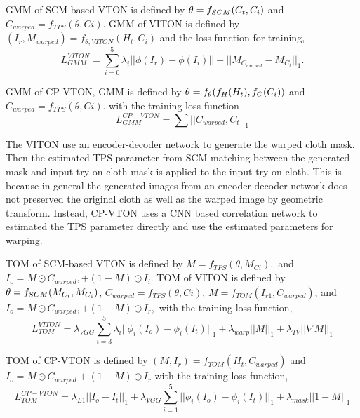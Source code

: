 GMM of SCM-based VTON is defined by  
$
   \bold{\theta} = f_{SCM} (C_t, C_i)
$
and
$
   C_{warped} = f_{TPS}(\theta, Ci)
$.    
GMM of VITON is defined by 
$
   (I_{r}, M_{warped}) = f_{\theta, VITON} (H_t, C_i) 
$
and the loss function for training, 
\begin{equation}
   L_{GMM}^{VITON} =   \sum_{i=0}^{5} \lambda_i || \phi (I_r) - \phi (I_i)||  + 
   ||M_{C_{warped}} -  M_{C_t}||_1 .
\end{equation}

GMM of CP-VTON, GMM is defined by 
$  
   \bold{\theta} = f_{\theta} ( f_H (H_t), f_C(C_i) )
$
and
$
   C_{warped} = f_{TPS}(\theta, Ci).
$    
with the training loss function
\begin{equation}
   L_{GMM}^{CP-VTON} =  \sum ||C_{warped}, C_t||_1
\end{equation}

The VITON use an encoder-decoder network to generate the warped cloth mask. Then the estimated TPS parameter from SCM matching between the generated mask and input try-on cloth mask is applied to the input try-on cloth. This is because in general the generated images from an encoder-decoder network does not preserved the original cloth as well as the warped image by geometric transform. Instead, CP-VTON uses a CNN based correlation network to estimated the TPS parameter directly and use the estimated parameters for warping.   


TOM  of SCM-based VTON  is defined by 
$
   M = f_{TPS}(\theta, M_{Ci}),
$    
and 
$
   I_o = M \odot C_{warped}, + (1-M) \odot I_i 
$.
TOM of VITON is defined by 
$
   \bold{\theta} = f_{SCM} (M_{C_t}, M_{C_i})
$,
$
   C_{warped} = f_{TPS}(\theta, Ci)
$,    
$
 M = f_{TOM} ( I_{r1}, C_{warped} ) 
$, 
and 
$
   I_o = M \odot C_{warped}, + (1-M) \odot I_{r},
$
with the training loss function, 
\begin{equation}
   L_{TOM}^{VITON} = \lambda_{VGG} \sum_{i=3}^{5} \lambda_i || \phi_i(I_o) - \phi_i(I_t)||_{1}  + 
             \lambda_{warp}  || M ||_{1}  + 
             \lambda_{TV} || \nabla M||_{1}      
\end{equation}

TOM of CP-VTON is defined by 
$
 (M, I_r) = f_{TOM} ( H_t, C_{warped} )  
$
and 
$
   I_o = M \odot C_{warped} + (1-M) \odot I_r
$
with the training loss function, 
\begin{equation}
   L_{TOM}^{CP-VTON} = \lambda_{L1}  || I_o - I_t ||_1  + 
             \lambda_{VGG} \sum_{i=1}^{5} || \phi_i(I_o) - \phi_i(I_t)||_1  + 
             \lambda_{mask} || 1 - M ||_1      
\end{equation}




